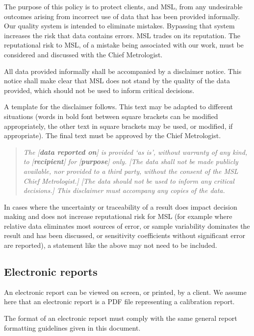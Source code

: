 The purpose of this policy is to protect clients, and MSL, from any undesirable outcomes arising from incorrect use of data that has been provided informally. Our quality system is intended to eliminate mistakes. Bypassing that system increases the risk that data contains errors. MSL trades on its reputation. The reputational risk to MSL, of a mistake being associated with our work, must be considered and discussed with the Chief Metrologist.

All data provided informally shall be accompanied by a disclaimer notice. This notice shall make clear that MSL does not stand by the quality of the data provided, which should not be used to inform critical decisions. 

A template for the disclaimer follows. This text may be adapted to different situations (words in bold font between square brackets can be modified appropriately, the other text in square brackets may be used, or modified, if appropriate). The final text must be approved by the Chief Metrologist.

\begin{quote}
\textit{The [\textbf{data reported on}] is provided `as is', without warranty of any kind, to [\textbf{recipient}] for [\textbf{purpose}] only. [{The data shall not be made publicly available, nor provided to a third party, without the consent of the MSL Chief Metrologist.}] [The data should not be used to inform any critical decisions.] This disclaimer must accompany any copies of the data.}
\end{quote}

In cases where the uncertainty or traceability of a result does impact decision making and does not increase reputational risk for MSL (for example where relative data eliminates most sources of error, or sample variability dominates the result and has been discussed, or sensitivity coefficients without significant error are reported), a statement like the above may not need to be included.

\subsection{Electronic reports}
 \label{ss:electronic_reports}
 
An electronic report can be viewed on screen, or printed, by a client. We assume here that an electronic report is a PDF file representing a calibration report. 

The format of an electronic report must comply with the same general report formatting guidelines given in this document. 


